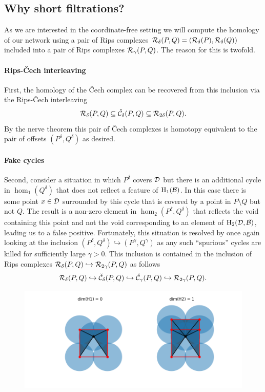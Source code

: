 \subsection{Why short filtrations?}

As we are interested in the coordinate-free setting we will compute the homology of our network using a pair of Rips complexes $\mathcal{R}_\delta(P, Q) = (\mathcal{R}_\delta(P),\mathcal{R}_\delta(Q))$ included into a pair of Rips complexes $\mathcal{R}_\gamma(P, Q)$.
The reason for this is twofold.

\paragraph{Rips-\v Cech interleaving}

First, the homology of the \v Cech complex can be recovered from this inclusion via the Rips-\v Cech interleaving
\[ \mathcal{R}_\delta(P, Q) \subseteq \check{\mathcal{C}}_\delta(P, Q)\subseteq \mathcal{R}_{2\delta}(P,Q).\]
By the nerve theorem this pair of \v Cech complexes is homotopy equivalent to the pair of offsets $(P^\delta, Q^\delta)$ as desired.

\paragraph{Fake cycles}
Second, consider a situation in which $P^\delta$ covers ${\mathcal{D}}$ but there is an additional cycle in $\hom_1(Q^\delta)$ that does not reflect a feature of $\mathrm{H}_1({\mathcal{B}})$.
In this case there is some point $x\in{\mathcal{D}}$ surrounded by this cycle that is covered by a point in $P\setminus Q$ but not $Q$.
The result is a non-zero element in $\hom_2(P^\delta, Q^\delta)$ that reflects the void containing this point and not the void corresponding to an element of $\mathrm{H}_2({\mathcal{D}},{\mathcal{B}})$, leading us to a false positive.
Fortunately, this situation is resolved by once again looking at the inclusion $(P^\delta, Q^\delta)\hookrightarrow (P^\gamma, Q^\gamma)$ as any such ``spurious'' cycles are killed for sufficiently large $\gamma > 0$.
This inclusion is contained in the inclusion of Rips complexes $\mathcal{R}_\delta(P, Q)\hookrightarrow\mathcal{R}_{2\gamma}(P, Q)$ as follows
\[ \mathcal{R}_\delta(P, Q) \hookrightarrow \check{\mathcal{C}}_\delta(P,Q)\hookrightarrow\check{\mathcal{C}}_\gamma(P,Q)\hookrightarrow\mathcal{R}_{2\gamma}(P, Q). \]

\begin{figure}[htbp]
\centering
    \includegraphics[scale=0.7]{figures/counter.png}
\end{figure}


